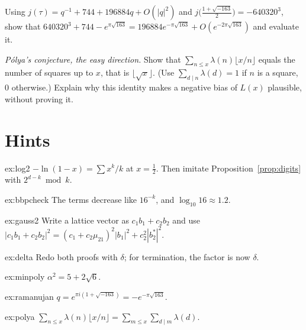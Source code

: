 \begin{exercise}[$\star\star$]\label{ex:ramanujan}
Using $j(\tau)=q^{-1}+744+196884q+O(|q|^2)$ and $j\bigl(\frac{1+\sqrt{-163}}2\bigr)=-640320^3$, show that $640320^3+744-e^{\pi\sqrt{163}}=196884e^{-\pi\sqrt{163}}+O(e^{-2\pi\sqrt{163}})$ and evaluate it.
\end{exercise}

\begin{exercise}[$\star\star\star$]\label{ex:polya}
\emph{Pólya's conjecture, the easy direction.} Show that $\sum_{n\le x}\lambda(n)\lfloor x/n\rfloor$ equals the number of squares up to $x$, that is $\lfloor\sqrt x\rfloor$. (Use $\sum_{d\mid n}\lambda(d)=1$ if $n$ is a square, $0$ otherwise.)
Explain why this identity makes a negative bias of $L(x)$ plausible, without proving it.
\end{exercise}

\section{Hints}

\begin{hint}{ex:log2}
$-\ln(1-x)=\sum x^k/k$ at $x=\frac12$. Then imitate Proposition~\ref{prop:digits} with $2^{d-k}\bmod k$.
\end{hint}

\begin{hint}{ex:bbpcheck}
The terms decrease like $16^{-k}$, and $\log_{10}16\approx1.2$.
\end{hint}

\begin{hint}{ex:gauss2}
Write a lattice vector as $c_1b_1+c_2b_2$ and use $|c_1b_1+c_2b_2|^2=(c_1+c_2\mu_{21})^2|b_1|^2+c_2^2|b_2^*|^2$.
\end{hint}

\begin{hint}{ex:delta}
Redo both proofs with $\delta$; for termination, the factor is now $\delta$.
\end{hint}

\begin{hint}{ex:minpoly}
$\alpha^2=5+2\sqrt6$.
\end{hint}

\begin{hint}{ex:ramanujan}
$q=e^{\pi i(1+\sqrt{-163})}=-e^{-\pi\sqrt{163}}$.
\end{hint}

\begin{hint}{ex:polya}
$\sum_{n\le x}\lambda(n)\lfloor x/n\rfloor=\sum_{m\le x}\sum_{d\mid m}\lambda(d)$.
\end{hint}

